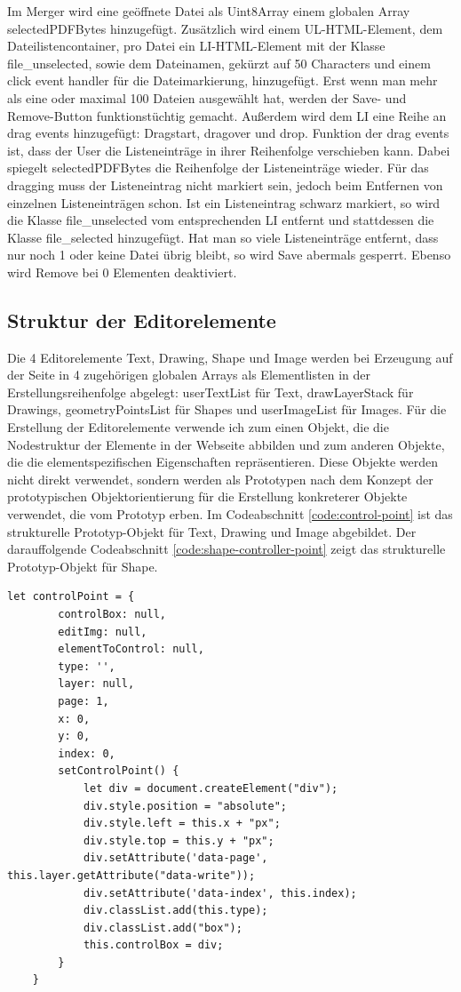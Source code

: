 Im Merger wird eine geöffnete Datei als Uint8Array einem globalen Array selectedPDFBytes hinzugefügt. Zusätzlich wird einem UL-HTML-Element, dem Dateilistencontainer, pro Datei ein LI-HTML-Element mit der Klasse file\_unselected, sowie dem Dateinamen, gekürzt auf 50 Characters und einem click event handler für die Dateimarkierung, hinzugefügt. Erst wenn man mehr als eine oder maximal 100 Dateien ausgewählt hat, werden der Save- und Remove-Button funktionstüchtig gemacht. Außerdem wird dem LI eine Reihe an drag events hinzugefügt: Dragstart, dragover und drop. Funktion der drag events ist, dass der User die Listeneinträge in ihrer Reihenfolge verschieben kann. Dabei spiegelt selectedPDFBytes die Reihenfolge der Listeneinträge wieder. Für das dragging muss der Listeneintrag nicht markiert sein, jedoch beim Entfernen von einzelnen Listeneinträgen schon. Ist ein Listeneintrag schwarz markiert, so wird die Klasse file\_unselected vom entsprechenden LI entfernt und stattdessen die Klasse file\_selected hinzugefügt. Hat man so viele Listeneinträge entfernt, dass nur noch 1 oder keine Datei übrig bleibt, so wird Save abermals gesperrt. Ebenso wird Remove bei 0 Elementen deaktiviert.

\subsection{Struktur der Editorelemente}
Die 4 Editorelemente Text, Drawing, Shape und Image werden bei Erzeugung auf der Seite in 4 zugehörigen globalen Arrays als Elementlisten in der Erstellungsreihenfolge abgelegt: userTextList für Text, drawLayerStack für Drawings, geometryPointsList für Shapes und userImageList für Images. Für die Erstellung der Editorelemente verwende ich zum einen Objekt, die die Nodestruktur der Elemente in der Webseite abbilden und zum anderen Objekte, die die elementspezifischen Eigenschaften repräsentieren. Diese Objekte werden nicht direkt verwendet, sondern werden als Prototypen nach dem Konzept der prototypischen Objektorientierung für die Erstellung konkreterer Objekte verwendet, die vom Prototyp erben. Im Codeabschnitt \ref{code:control-point} ist das strukturelle Prototyp-Objekt für Text, Drawing und Image abgebildet. Der darauffolgende Codeabschnitt \ref{code:shape-controller-point} zeigt das strukturelle Prototyp-Objekt für Shape.

\begin{lstlisting}[style=ES6, caption={Prototyp-Objekt für die Node-Struktur von Text, Drawing und Image}, label=code:control-point, breaklines=true]
	let controlPoint = {
		controlBox: null,
		editImg: null,
		elementToControl: null,
		type: '',
		layer: null,
		page: 1,
		x: 0,
		y: 0,
		index: 0,
		setControlPoint() {
			let div = document.createElement("div");
			div.style.position = "absolute";
			div.style.left = this.x + "px";
			div.style.top = this.y + "px";
			div.setAttribute('data-page', this.layer.getAttribute("data-write"));
			div.setAttribute('data-index', this.index);
			div.classList.add(this.type);
			div.classList.add("box");
			this.controlBox = div;
		}
	}
\end{lstlisting}

